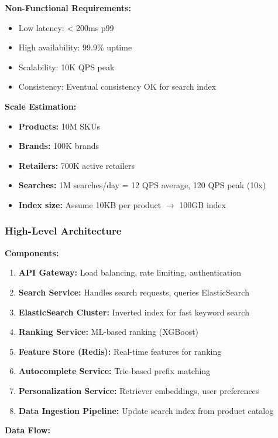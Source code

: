 \documentclass[11pt,letterpaper]{article}
\begin{document}
\textbf{Non-Functional Requirements:}
\begin{itemize}
    \item Low latency: < 200ms p99
    \item High availability: 99.9\% uptime
    \item Scalability: 10K QPS peak
    \item Consistency: Eventual consistency OK for search index
\end{itemize}

\textbf{Scale Estimation:}
\begin{itemize}
    \item \textbf{Products:} 10M SKUs
    \item \textbf{Brands:} 100K brands
    \item \textbf{Retailers:} 700K active retailers
    \item \textbf{Searches:} 1M searches/day = 12 QPS average, 120 QPS peak (10x)
    \item \textbf{Index size:} Assume 10KB per product $\rightarrow$ 100GB index
\end{itemize}

\subsubsection{High-Level Architecture}

\textbf{Components:}

\begin{enumerate}
    \item \textbf{API Gateway:} Load balancing, rate limiting, authentication
    \item \textbf{Search Service:} Handles search requests, queries ElasticSearch
    \item \textbf{ElasticSearch Cluster:} Inverted index for fast keyword search
    \item \textbf{Ranking Service:} ML-based ranking (XGBoost)
    \item \textbf{Feature Store (Redis):} Real-time features for ranking
    \item \textbf{Autocomplete Service:} Trie-based prefix matching
    \item \textbf{Personalization Service:} Retriever embeddings, user preferences
    \item \textbf{Data Ingestion Pipeline:} Update search index from product catalog
\end{enumerate}

\textbf{Data Flow:}
\end{document}
